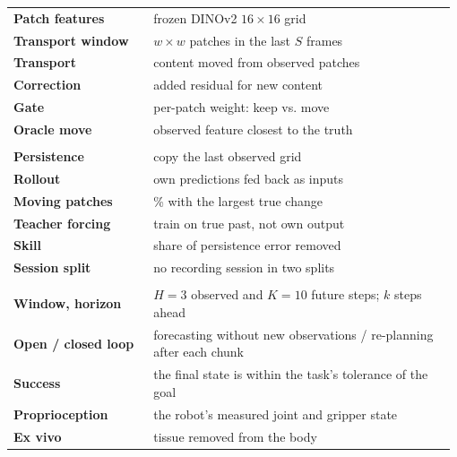{\begin{minipage}[t]{0.49\linewidth}
\begin{tabular}[t]{@{}>{\raggedright\arraybackslash}p{0.31\linewidth}>{\raggedright\arraybackslash}p{0.67\linewidth}@{}}
\textbf{Patch features} & frozen DINOv2 $16{\times}16$ grid \\
\textbf{Transport window} & $w{\times}w$ patches in the last $S$ frames \\
\textbf{Transport} & content moved from observed patches \\
\textbf{Correction} & added residual for new content \\
\textbf{Gate} & per-patch weight: keep vs. move \\
\textbf{Oracle move} & observed feature closest to the truth \\
\addlinespace[2pt]
\multicolumn{2}{@{}l}{\textcolor[HTML]{00785A}{\textbf{Evaluation}}}\\[1pt]
\textbf{Persistence} & copy the last observed grid \\
\textbf{Rollout} & own predictions fed back as inputs \\
\textbf{Moving patches} & 25\% with the largest true change \\
\textbf{Teacher forcing} & train on true past, not own output \\
\textbf{Skill} & share of persistence error removed \\
\textbf{Session split} & no recording session in two splits \\
\addlinespace[2pt]
\multicolumn{2}{@{}l}{\textcolor[HTML]{243447}{\textbf{Other}}}\\[1pt]
\textbf{Window, horizon} & $H{=}3$ observed and $K{=}10$ future steps; $k$ steps ahead \\
\textbf{Open / closed loop} & forecasting without new observations / re-planning after each chunk \\
\textbf{Success} & the final state is within the task's tolerance of the goal \\
\textbf{Proprioception} & the robot's measured joint and gripper state \\
\textbf{Ex vivo} & tissue removed from the body \\
\end{tabular}
\end{minipage}}
